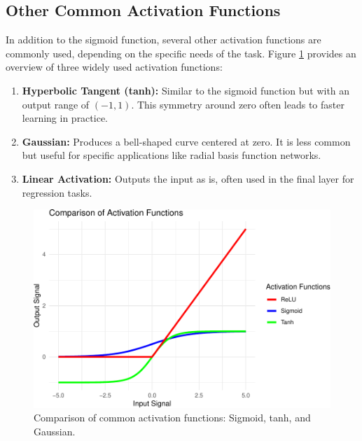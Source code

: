 \documentclass[
]{book}
\providecommand{\tightlist}{%
  \setlength{\itemsep}{0pt}\setlength{\parskip}{0pt}}
\theoremstyle{definition}
\theoremstyle{definition}
\theoremstyle{definition}
\theoremstyle{definition}
\theoremstyle{remark}
\begin{document}
\subsection*{Other Common Activation Functions}\label{other-common-activation-functions}

In addition to the sigmoid function, several other activation functions are commonly used, depending on the specific needs of the task. Figure \ref{fig:active-fun-comparison} provides an overview of three widely used activation functions:

\begin{enumerate}
\def\labelenumi{\arabic{enumi}.}
\tightlist
\item
  \textbf{Hyperbolic Tangent (tanh):} Similar to the sigmoid function but with an output range of \((-1, 1)\). This symmetry around zero often leads to faster learning in practice.\\
\item
  \textbf{Gaussian:} Produces a bell-shaped curve centered at zero. It is less common but useful for specific applications like radial basis function networks.\\
\item
  \textbf{Linear Activation:} Outputs the input as is, often used in the final layer for regression tasks.
\end{enumerate}

\begin{figure}

{\centering \includegraphics[width=0.8\linewidth]{nn_files/figure-latex/active-fun-comparison-1} 

}

\caption{Comparison of common activation functions: Sigmoid, tanh, and Gaussian.}\label{fig:active-fun-comparison}
\end{figure}
\end{document}
